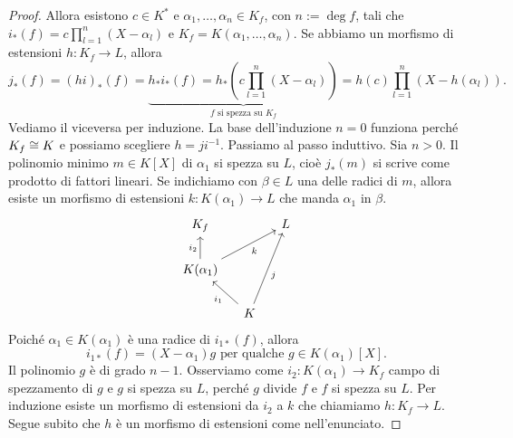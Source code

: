 \begin{proof}
Allora esistono \(c \in K^\ast\) e \(\alpha_1, \dots{}, \alpha_n \in K_f\), con \(n := \deg f\), tali che \(i_\ast(f) = c\prod_{l=1}^n(X-\alpha_l)\) e \(K_f = K(\alpha_1,\dots,\alpha_n)\).\newline
Se abbiamo un morfismo di estensioni \(h : K_f \to L\), allora
\[j_\ast(f) = (h i)_\ast (f) = \underbrace{h_\ast i_\ast (f) = h_\ast \left( c \prod_{l=1}^n (X-\alpha_l) \right)}_{f \text{ si spezza su } K_f} = h(c) \prod_{l=1}^n \left(X-h\left(\alpha_l\right)\right) .\]
Vediamo il viceversa per induzione. La base dell'induzione \(n=0\) funziona perché \(K_f \cong K\) e possiamo scegliere \(h = j i^{-1}\). Passiamo al passo induttivo. Sia \(n > 0\). Il polinomio minimo \(m \in K[X]\) di \(\alpha_1\) si spezza su \(L\), cioè \(j_\ast(m)\) si scrive come prodotto di fattori lineari. Se indichiamo con \(\beta \in L\) una delle radici di \(m\), allora esiste un morfismo di estensioni \(k : K(\alpha_1) \to L\) che manda \(\alpha_1\) in \(\beta\).
\[\begin{tikzcd}[column sep=small]
K_f  & & L \\
K(\alpha_1) \ar["{i_2}", u] \ar["k", urr, swap] \\
& K \ar["{i_1}", ul] \ar["j", uur, swap]
\end{tikzcd}\]
Poiché \(\alpha_1 \in K(\alpha_1)\) è una radice di \(i_{1\ast}(f)\), allora
\[i_{1\ast}(f) = (X-\alpha_1) g \text{ per qualche } g \in K(\alpha_1)[X] .\]
Il polinomio \(g\) è di grado \(n-1\). Osserviamo come \(i_2 : K(\alpha_1) \to K_f\) campo di spezzamento di \(g\) e \(g\) si spezza su \(L\), perché \(g\) divide \(f\) e \(f\) si spezza su \(L\). Per induzione esiste un morfismo di estensioni da \(i_2\) a \(k\) che chiamiamo \(h : K_f \to L\). Segue subito che \(h\) è un morfismo di estensioni come nell'enunciato.
\end{proof}

